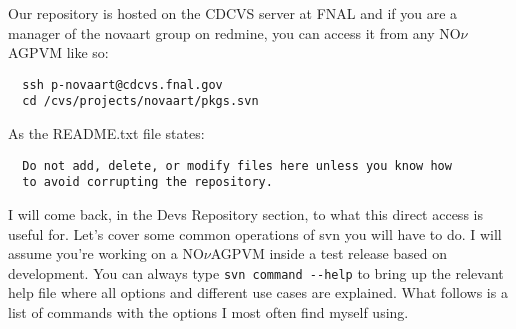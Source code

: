 \documentclass[letterpaper,10pt]{article}
\newcommand{\nova}{NO$\nu$A}
\newcommand{\novas}{\nova \space}
\begin{document}
\noindent
Our repository is hosted on the CDCVS server at FNAL and if you are a manager of the novaart group on redmine, you can access it from any \novas GPVM like so:
\begin{verbatim}
  ssh p-novaart@cdcvs.fnal.gov
  cd /cvs/projects/novaart/pkgs.svn
\end{verbatim}
As the README.txt file states: 
\begin{verbatim}
  Do not add, delete, or modify files here unless you know how
  to avoid corrupting the repository.
\end{verbatim}
I will come back, in the Devs Repository section, to what this direct access is useful for. Let's cover some common operations of svn you will have to do. I will assume you're working on a \novas GPVM inside a test release based on development. You can always type \verb|svn command --help| to bring up the relevant help file where all options and different use cases are explained. What follows is a list of commands with the options I most often find myself using.
\end{document}
